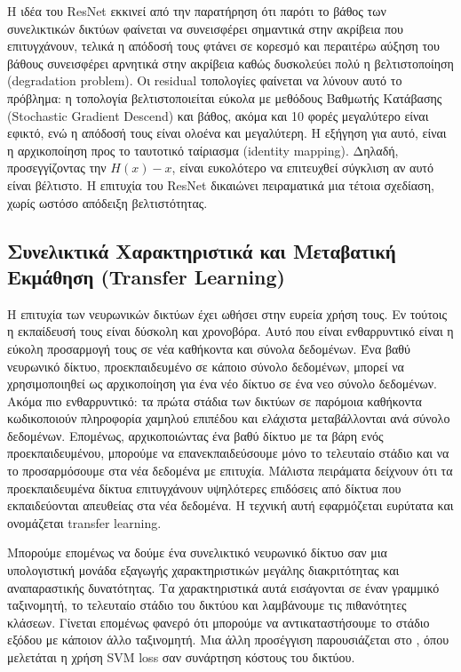 \documentclass[11pt,a4paper,english,greek,twoside]{../Thesis}
\begin{document}
\par Η ιδέα του ResNet εκκινεί από την παρατήρηση ότι παρότι το βάθος των συνελικτικών δικτύων φαίνεται να συνεισφέρει σημαντικά στην ακρίβεια που επιτυγχάνουν, τελικά η απόδοσή τους φτάνει σε κορεσμό και περαιτέρω αύξηση του βάθους συνεισφέρει αρνητικά στην ακρίβεια καθώς δυσκολεύει πολύ η βελτιστοποίηση (degradation problem). Οι residual τοπολογίες φαίνεται να λύνουν αυτό το πρόβλημα: η τοπολογία βελτιστοποιείται εύκολα με μεθόδους Βαθμωτής Κατάβασης (Stochastic Gradient Descend) και βάθος, ακόμα και 10 φορές μεγαλύτερο είναι εφικτό, ενώ η απόδοσή τους είναι ολοένα και μεγαλύτερη. Η εξήγηση για αυτό, είναι η αρχικοποίηση προς το ταυτοτικό ταίριασμα (identity mapping). Δηλαδή, προσεγγίζοντας την $H(x)-x$, είναι ευκολότερο να επιτευχθεί σύγκλιση αν αυτό είναι βέλτιστο. Η επιτυχία του ResNet δικαιώνει πειραματικά μια τέτοια σχεδίαση, χωρίς ωστόσο απόδειξη βελτιστότητας.

\subsection{Συνελικτικά Χαρακτηριστικά και Μεταβατική Εκμάθηση (Transfer Learning)}
Η επιτυχία των νευρωνικών δικτύων έχει ωθήσει στην ευρεία χρήση τους. Εν τούτοις η εκπαίδευσή τους είναι δύσκολη και χρονοβόρα. Αυτό που είναι ενθαρρυντικό είναι η εύκολη προσαρμογή τους σε νέα καθήκοντα και σύνολα δεδομένων. Ένα βαθύ νευρωνικό δίκτυο, προεκπαιδευμένο σε κάποιο σύνολο δεδομένων, μπορεί να χρησιμοποιηθεί ως αρχικοποίηση για ένα νέο δίκτυο σε ένα νεο σύνολο δεδομένων. Ακόμα πιο ενθαρρυντικό: τα πρώτα στάδια των δικτύων σε παρόμοια καθήκοντα κωδικοποιούν πληροφορία χαμηλού επιπέδου και ελάχιστα μεταβάλλονται ανά σύνολο δεδομένων. Επομένως, αρχικοποιώντας ένα βαθύ δίκτυο με τα βάρη ενός προεκπαιδευμένου, μπορούμε να επανεκπαιδεύσουμε μόνο το τελευταίο στάδιο και να το προσαρμόσουμε στα νέα δεδομένα με επιτυχία. Μάλιστα πειράματα δείχνουν ότι τα προεκπαιδευμένα δίκτυα επιτυγχάνουν υψηλότερες επιδόσεις από δίκτυα που εκπαιδεύονται απευθείας στα νέα δεδομένα. Η τεχνική αυτή εφαρμόζεται ευρύτατα και ονομάζεται transfer learning.

\par Μπορούμε επομένως να δούμε ένα συνελικτικό νευρωνικό δίκτυο σαν μια υπολογιστική μονάδα εξαγωγής χαρακτηριστικών μεγάλης διακριτότητας και αναπαραστικής δυνατότητας. Τα χαρακτηριστικά αυτά εισάγονται σε έναν γραμμικό ταξινομητή, το τελευταίο στάδιο του δικτύου και λαμβάνουμε τις πιθανότητες κλάσεων. Γίνεται επομένως φανερό ότι μπορούμε να αντικαταστήσουμε το στάδιο εξόδου με κάποιον άλλο ταξινομητή. Μια άλλη προσέγγιση παρουσιάζεται στο \cite{tang_2013}, όπου μελετάται η χρήση SVM loss σαν συνάρτηση κόστους του δικτύου.
\end{document}
